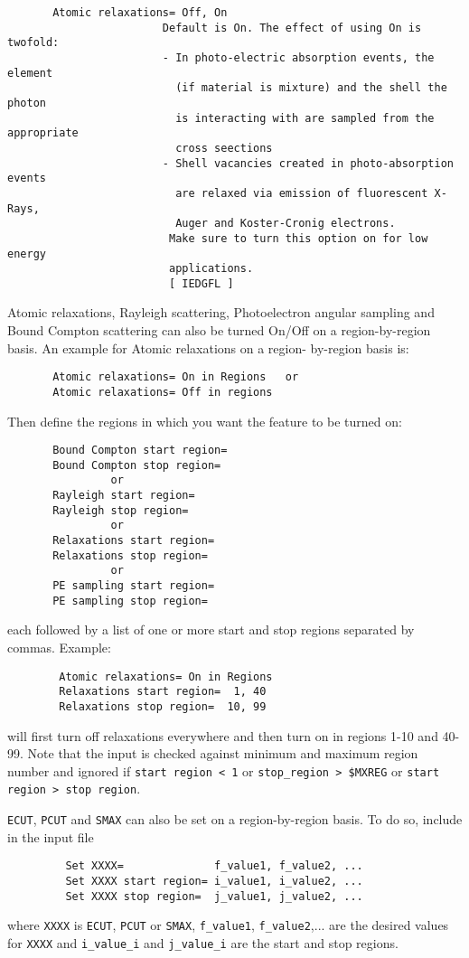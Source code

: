 \begin{verbatim}
       Atomic relaxations= Off, On
                        Default is On. The effect of using On is twofold:
                        - In photo-electric absorption events, the element
                          (if material is mixture) and the shell the photon
                          is interacting with are sampled from the appropriate
                          cross seections
                        - Shell vacancies created in photo-absorption events
                          are relaxed via emission of fluorescent X-Rays,
                          Auger and Koster-Cronig electrons.
                         Make sure to turn this option on for low energy
                         applications.
                         [ IEDGFL ]
\end{verbatim}

\noindent
Atomic relaxations, Rayleigh scattering, Photoelectron angular sampling
and Bound Compton scattering can also be turned On/Off on a
region-by-region basis. An example for Atomic relaxations on a region-
by-region basis is:

\begin{verbatim}
       Atomic relaxations= On in Regions   or
       Atomic relaxations= Off in regions
\end{verbatim}

Then define the regions in which you want the feature to be turned on:

\begin{verbatim}
       Bound Compton start region=
       Bound Compton stop region=
                or
       Rayleigh start region=
       Rayleigh stop region=
                or
       Relaxations start region=
       Relaxations stop region=
                or
       PE sampling start region=
       PE sampling stop region=
\end{verbatim}
each followed by a list of one or more start and stop regions
separated by commas. Example:
\begin{verbatim}
        Atomic relaxations= On in Regions
        Relaxations start region=  1, 40
        Relaxations stop region=  10, 99
\end{verbatim}
will first turn off relaxations everywhere and
then turn on in regions 1-10 and 40-99.
Note that the input is checked against minimum and maximum
region number and ignored if
\verb+start region < 1+ or \verb+stop_region > $MXREG+ or
\verb+start region > stop region+.

\verb+ECUT+, \verb+PCUT+ and \verb+SMAX+ can also be set on a
region-by-region basis. To do so, include in the input file
\begin{verbatim}
         Set XXXX=              f_value1, f_value2, ...
         Set XXXX start region= i_value1, i_value2, ...
         Set XXXX stop region=  j_value1, j_value2, ...
\end{verbatim}
where \verb+XXXX+ is \verb+ECUT+, \verb+PCUT+ or \verb+SMAX+,
\verb+f_value1+, \verb+f_value2+,...
are the desired values for \verb+XXXX+ and \verb+i_value_i+ and
\verb+j_value_i+ are the start and stop regions.

